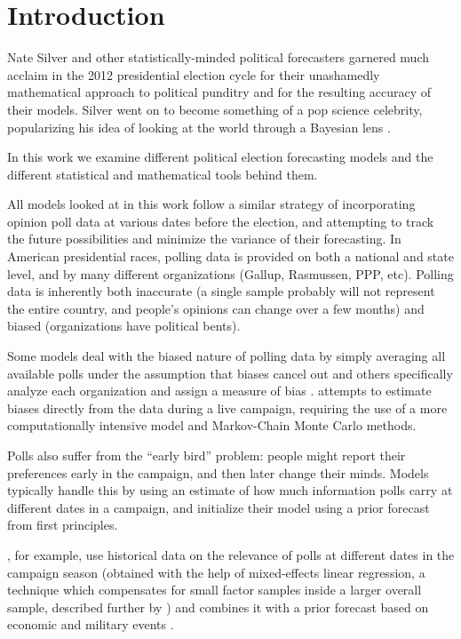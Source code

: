 \documentclass[thesis.tex]{subfiles}
\begin{document}
\section{Introduction}

Nate Silver and other statistically-minded political forecasters garnered much acclaim in the 2012 presidential election cycle for their unashamedly mathematical approach to political punditry and for the resulting accuracy of their models. Silver went on to become something of a pop science celebrity, popularizing his idea of looking at the world through a Bayesian lens \citep{Silver:2012aa}.

In this work we examine different political election forecasting models and the different statistical and mathematical tools behind them.

All models looked at in this work follow a similar strategy of incorporating opinion poll data at various dates before the election, and attempting to track the future possibilities and minimize the variance of their forecasting. In American presidential races, polling data is provided on both a national and state level, and by many different organizations (Gallup, Rasmussen, PPP, etc). Polling data is inherently both inaccurate (a single sample probably will not represent the entire country, and people's opinions can change over a few months) and biased (organizations have political bents).

Some models deal with the biased nature of polling data by simply averaging all available polls under the assumption that biases cancel out \citep{Wang:2012aa} and others specifically analyze each organization and assign a measure of bias \citep{Silver:2012aa}. \citet{Strauss:2007aa} attempts to estimate biases directly from the data during a live campaign, requiring the use of a more computationally intensive model and Markov-Chain Monte Carlo methods.

Polls also suffer from the ``early bird'' problem: people might report their preferences early in the campaign, and then later change their minds. Models typically handle this by using an estimate of how much information polls carry at different dates in a campaign, and initialize their model using a prior forecast from first principles.

\citet{Lock:2010aa}, for example, use historical data on the relevance of polls at different dates in the campaign season (obtained with the help of mixed-effects linear regression, a technique which compensates for small factor samples inside a larger overall sample, described further by \citealt{Gelman:2006aa}) and combines it with a prior forecast based on economic and military events \citep{Hibbs:2008aa}.
\end{document}

